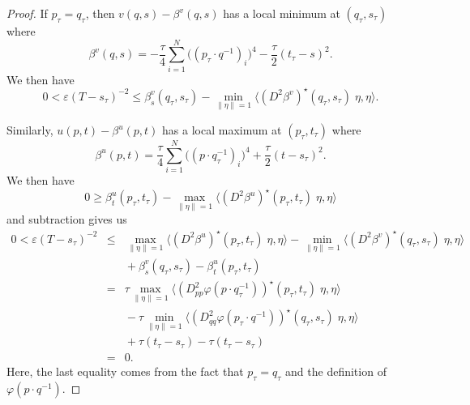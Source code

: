 \documentclass[12pt]{amsart}
\theoremstyle{definition}
\theoremstyle{remark}
\numberwithin{equation}{section}
\begin{document}
\begin{proof}
If $p_\tau = q_\tau$, then 
$v(q,s)-\beta^v(q,s)$ has a local minimum at $(q_\tau,s_\tau)$ where 
$$\beta^v(q,s)=- \frac{\tau}{4}\sum_{i=1}^{N}\big((p_\tau\cdot q^{-1})_i \big)^4-\frac{\tau}{2}(t_\tau-s)^2.$$  We then have 
$$0<\varepsilon(T-s_\tau)^{-2} \leq \beta^v_s(q_\tau,s_\tau)-\min_{\|\eta\|=1}{\ensuremath{\langle {(D^2\beta^v)^\star (q_\tau,s_\tau)\;\eta} , {\eta} \rangle}}.$$

Similarly, $u(p,t)-\beta^u(p,t)$ has a local maximum at $(p_\tau,t_\tau)$ where 
$$\beta^u(p,t)=\frac{\tau}{4}\sum_{i=1}^{N}\big((p\cdot q_\tau^{-1})_i \big)^4+\frac{\tau}{2}(t-s_\tau)^2.$$
We then have 
$$0 \geq \beta^u_t(p_\tau,t_\tau)-\max_{\|\eta\|=1}{\ensuremath{\langle {(D^2\beta^u)^\star (p_\tau,t_\tau)\;\eta} , {\eta} \rangle}}$$
and subtraction gives us 
\begin{eqnarray*}
0<\varepsilon(T-s_\tau)^{-2} & \leq &\max_{\|\eta\|=1}{\ensuremath{\langle {(D^2\beta^u)^\star (p_\tau,t_\tau)\;\eta} , {\eta} \rangle}}-\min_{\|\eta\|=1}{\ensuremath{\langle {(D^2\beta^v)^\star (q_\tau,s_\tau)\;\eta} , {\eta} \rangle}} \\
& & \mbox{}+ \beta^v_s(q_\tau,s_\tau)-\beta^u_t(p_\tau,t_\tau) \\
 & = & \tau\max_{\|\eta\|=1}{\ensuremath{\langle {(D_{pp}^2\varphi(p\cdot q_\tau^{-1}))^\star (p_\tau,t_\tau)\;\eta} , {\eta} \rangle}} \\
 & & \mbox{}-\tau\min_{\|\eta\|=1}{\ensuremath{\langle {(D^2_{qq}\varphi(p_\tau\cdot q^{-1}))^\star (q_\tau,s_\tau)\;\eta} , {\eta} \rangle}} \\
 & & \mbox{}+ \tau(t_\tau-s_\tau)- \tau(t_\tau-s_\tau) \\
 & = & 0.
\end{eqnarray*}
Here, the last equality comes from the fact that $p_\tau=q_\tau$ and the definition of $\varphi(p\cdot q^{-1})$.
\end{proof}

 
\end{document}
